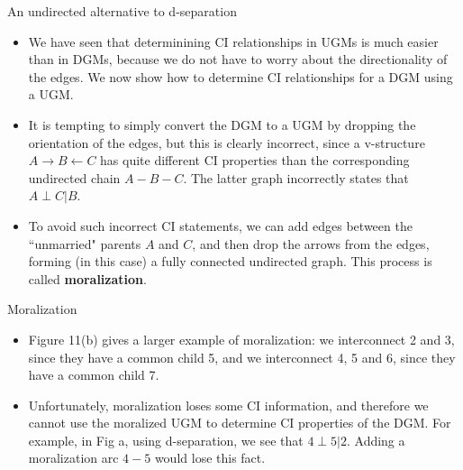 \documentclass[10pt,mathserif]{beamer}
\begin{document}
\begin{frame}{An undirected alternative to d-separation}
\begin{itemize}
    \item We have seen that determinining CI relationships in UGMs is much easier than in DGMs, because we do not have to worry about the directionality of the edges. We now show how to determine CI relationships for a DGM using a UGM.
    \item It is tempting to simply convert the DGM to a UGM by dropping the orientation of the edges, but this is clearly incorrect, since a v-structure $A \rightarrow B \leftarrow C$ has quite different CI properties than the corresponding undirected chain $A - B - C$. The latter graph incorrectly states that $A \perp C|B$.
    \item To avoid such incorrect CI statements, we can add edges between the ``unmarried" parents $A$ and $C$, and then drop the arrows from the edges, forming (in this case) a fully connected undirected graph. This process is called \textbf{moralization}.
\end{itemize}
\end{frame}

\begin{frame}{Moralization}
\begin{itemize}
    \item Figure 11(b) gives a larger example of moralization: we interconnect 2 and 3, since they have a common child 5, and we interconnect 4, 5 and 6, since they have a common child 7.
    \item Unfortunately, moralization loses some CI information, and therefore we cannot use the moralized UGM to determine CI properties of the DGM. For example, in Fig a, using d-separation, we see that $4 \perp 5|2$. Adding a moralization arc $4 - 5$ would lose this fact.
\end{itemize}
\end{frame}
\end{document}
